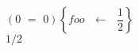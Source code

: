 \documentclass[letterpaper]{article}
\begin{document}
    $\left(\text{0 $=$ 0}\right)$$\left\{\text{$foo$ $\leftarrow$ $\dfrac{1}{2}$}\right\}$\\
    $1/2$\\
\end{document}
